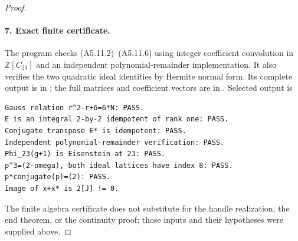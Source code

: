 \begin{proof}
\paragraph{7. Exact finite certificate.}
The program  checks
(A5.11.2)--(A5.11.6) using integer coefficient convolution in
$\mathbb Z[C_{23}]$ and an independent polynomial-remainder
implementation.  It also verifies the two quadratic ideal
identities by Hermite normal form.  Its complete output is in
; the full matrices and
coefficient vectors are in
.  Selected output is
\begin{verbatim}
Gauss relation r^2-r+6=6*N: PASS.
E is an integral 2-by-2 idempotent of rank one: PASS.
Conjugate transpose E* is idempotent: PASS.
Independent polynomial-remainder verification: PASS.
Phi_23(g+1) is Eisenstein at 23: PASS.
p^3=(2-omega), both ideal lattices have index 8: PASS.
p*conjugate(p)=(2): PASS.
Image of x+x* is 2[J] != 0.
\end{verbatim}
The finite algebra certificate does not substitute for the
handle realization, the end theorem, or the continuity proof;
those inputs and their hypotheses were supplied above.
\end{proof}
